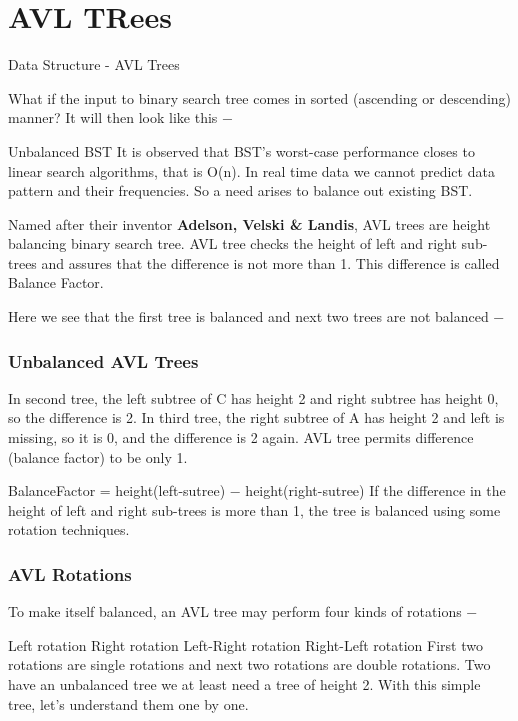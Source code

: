 \documentclass{beamer}
\begin{document}
\section{AVL TRees}
\begin{frame}


Data Structure - AVL Trees
\end{frame}
\begin{frame}
What if the input to binary search tree comes in sorted (ascending or descending) manner? It will then look like this −

Unbalanced BST
It is observed that BST's worst-case performance closes to linear search algorithms, that is Ο(n). In real time data we cannot predict data pattern and their frequencies. So a need arises to balance out existing BST.
\end{frame}
\begin{frame}
Named after their inventor \textbf{Adelson, Velski \& Landis}, AVL trees are height balancing binary search tree. AVL tree checks the height of left and right sub-trees and assures that the difference is not more than 1. This difference is called Balance Factor.

Here we see that the first tree is balanced and next two trees are not balanced −

\end{frame}
\begin{frame}
\frametitle{Unbalanced AVL Trees}
\large
In second tree, the left subtree of C has height 2 and right subtree has height 0, so the difference is 2. In third tree, the right subtree of A has height 2 and left is missing, so it is 0, and the difference is 2 again. AVL tree permits difference (balance factor) to be only 1.

BalanceFactor = height(left-sutree) − height(right-sutree)
If the difference in the height of left and right sub-trees is more than 1, the tree is balanced using some rotation techniques.
\end{frame}
\begin{frame}
\frametitle{AVL Rotations}
\large

To make itself balanced, an AVL tree may perform four kinds of rotations −

Left rotation
Right rotation
Left-Right rotation
Right-Left rotation
First two rotations are single rotations and next two rotations are double rotations. Two have an unbalanced tree we at least need a tree of height 2. With this simple tree, let's understand them one by one.
\end{frame}
\end{document}

